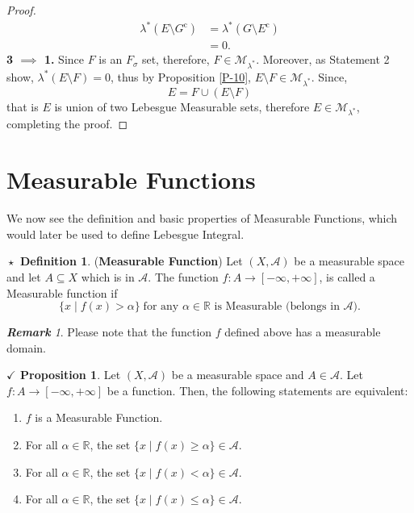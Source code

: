 \documentclass{article}
\theoremstyle{definition}
\newtheorem{definition}{$\boxed{\star}$ Definition}
\theoremstyle{remark}
\newtheorem*{remark}{\textbf{Remark}}
\theoremstyle{definition}
\theoremstyle{definition}
\newtheorem{proposition}{$\checkmark$ Proposition}
\theoremstyle{definition}
\newcommand{\union}{\cup}
\newcommand{\where}{\;\vert\;}
\newcommand{\R}{\mathbb{R}}
\newcommand{\alg}[1]{\mathscr{#1}}
\newcommand{\comp}[1]{#1^{\text{c}}}
\newcommand{\lom}[1]{\lambda^*\left (#1\right )}
\newcommand{\set}[1]{\mathscr{#1}}
\newcommand{\msigm}[1]{\set{M}_{#1}}
\begin{document}
\begin{proof}
\begin{equation*}
	\begin{split}
		\lom{E\setminus\comp{G}} &= \lom{G\setminus\comp{E}}\\	
		&= 0.
	\end{split}
\end{equation*}
\textbf{3 $ \implies $ 1.} Since $ F $ is an $ F_\sigma $ set, therefore, $ F \in \msigm{\lambda^*}$. Moreover, as Statement 2 show, $ \lom{E\setminus F} = 0 $, thus by Proposition \ref{P-10}, $ E\setminus F \in \msigm{\lambda^*}$. Since,
\[E = F \union (E\setminus F)\]
that is $ E $ is union of two Lebesgue Measurable sets, therefore $ E \in \msigm{\lambda^*} $, completing the proof.
\end{proof}
\hrulefill

\newpage
\section{Measurable Functions}
We now see the definition and basic properties of Measurable Functions, which would later be used to define Lebesgue Integral.
\begin{definition}
	(\textbf{Measurable Function}) Let $ (X,\alg{A}) $ be a measurable space and let $ A \subseteq X$ which is in $ \alg{A} $. The function $ f : A\to [-\infty,+\infty] $, is called a Measurable function if 
	\[\{x \where f(x) > \alpha\}\;\text{for any }\alpha \in \R \text{ is Measurable (belongs in $\alg{A} $).}\]
\end{definition}
\begin{remark}
	Please note that the function $ f $ defined above has a measurable domain.
\end{remark}
\hrulefill
\begin{proposition}
	Let $ (X,\alg{A}) $ be a measurable space and $ A\in \alg{A} $. Let $ f : A\to [-\infty,+\infty]$ be a function. Then, the following statements are equivalent:
	\begin{enumerate}
		\item {$ f $ is a Measurable Function.}
		\item {For all $ \alpha \in \R $, the set $ \{x\where f(x)\ge \alpha\} \in \alg{A}$.}
		\item {For all $ \alpha \in \R $, the set $ \{x\where f(x)< \alpha\} \in \alg{A}$.}
		\item {For all $ \alpha \in \R $, the set $ \{x\where f(x)\le \alpha\} \in \alg{A}$.}
	\end{enumerate}
\end{proposition}
\end{document}

